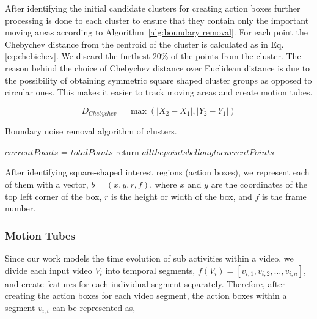 After identifying the initial candidate clusters for creating action boxes further processing is done to each cluster to ensure that they contain only the important moving areas according to Algorithm~\ref{alg:boundary removal}. For each point the Chebychev distance from the centroid of the cluster is calculated as in
Eq. \ref{eq:chebichev}. We discard the furthest 20\% of the points from the cluster. The reason behind the choice of Chebychev distance over Euclidean distance is due to the possibility of obtaining symmetric square shaped cluster groups as opposed to circular ones. This makes it easier to track moving areas and create motion tubes.

\begin{equation}\label{eq:chebichev}
 D_{Chebychev} = \max(|X_{2} - X_{1}|,|Y_{2}-Y_{1}|)
\end{equation}

\begin{algorithm*}
   \caption{Boundary noise removal algorithm of clusters.}
   \label{alg:boundary removal}
    \begin{algorithmic}[1]
	\State $currentPoints$ = $totalPoints$
	    \State return $all the points bellong to currentPoints$
	  \EndIf
	
	\EndWhile
     \EndFunction


\end{algorithmic}
\end{algorithm*}

After identifying square-shaped interest regions (action boxes), we represent each of them with a vector, $b = (x,y,r,f)$, where $x$ and $y$ are the coordinates
of the top left corner of the box, $r$ is the height or width of the box, and $f$ is the frame number.


\subsubsection{Motion Tubes}
Since our work models the time evolution of sub activities within a video, we divide each input video $V_{i}$ into temporal segments, $f(V_{i}) = [v_{i,1},
v_{i,2}, \dots, v_{i,n}]$,
and create features for each individual segment separately. Therefore, after creating the action boxes for each video segment,
the action boxes within a segment $v_{i,t}$ can be represented as,

